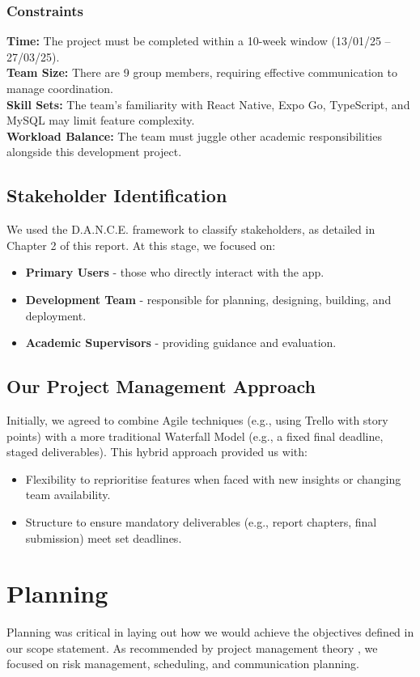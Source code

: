 \subsubsection{Constraints}
\textbf{Time:} The project must be completed within a 10-week window (13/01/25 – 27/03/25).\\
\textbf{Team Size:} There are 9 group members, requiring effective communication to manage coordination.\\
\textbf{Skill Sets:} The team’s familiarity with React Native, Expo Go, TypeScript, and MySQL may limit feature complexity.\\
\textbf{Workload Balance:} The team must juggle other academic responsibilities alongside this development project.

\subsection{Stakeholder Identification}
We used the D.A.N.C.E. framework to classify stakeholders, as detailed in Chapter 2 of this report. At this stage, we focused on:
\begin{itemize}
    \item \textbf{Primary Users} - those who directly interact with the app.
    \item \textbf{Development Team} - responsible for planning, designing, building, and deployment.
    \item \textbf{Academic Supervisors} - providing guidance and evaluation.
\end{itemize}

\subsection{Our Project Management Approach}
Initially, we agreed to combine Agile techniques (e.g., using Trello with story points) with a more traditional Waterfall Model (e.g., a fixed final deadline, staged deliverables). This hybrid approach provided us with:
\begin{itemize}
    \item Flexibility to reprioritise features when faced with new insights or changing team availability.
    \item Structure to ensure mandatory deliverables (e.g., report chapters, final submission) meet set deadlines.
\end{itemize}

\section{Planning}
Planning was critical in laying out how we would achieve the objectives defined in our scope statement. As recommended by project management theory \cite{pmbok2017}, we focused on risk management, scheduling, and communication planning.

